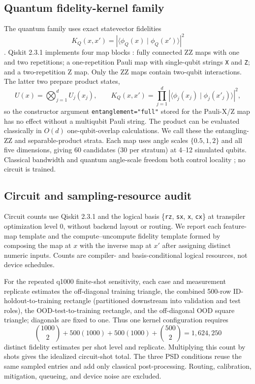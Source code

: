 \documentclass[referee,lineno,pdflatex,sn-nature]{sn-jnl}
\theoremstyle{thmstyleone}%
\theoremstyle{thmstyletwo}%
\theoremstyle{thmstylethree}%
\begin{document}
\subsection{Quantum fidelity-kernel family}

The quantum family uses exact statevector fidelities
\[
K_Q(x,x')=\left|\langle\phi_Q(x)\mid\phi_Q(x')\rangle\right|^2
\]
\cite{havlicek2019quantumenhanced,schuld2019featurehilbert}. Qiskit 2.3.1 implements four map blocks \cite{javadiabhari2024qiskit}: fully connected ZZ maps with one and two repetitions; a one-repetition Pauli map with single-qubit strings \texttt{X} and \texttt{Z}; and a two-repetition Z map. Only the ZZ maps contain two-qubit interactions. The latter two prepare product states,
\[
U(x)=\bigotimes_{j=1}^{d}U_j(x_j),\qquad
K_Q(x,x')=\prod_{j=1}^{d}
\left|\langle\phi_j(x_j)\mid\phi_j(x'_j)\rangle\right|^2,
\]
so the constructor argument \texttt{entanglement="full"} stored for the Pauli-X/Z map has no effect without a multiqubit Pauli string. The product can be evaluated classically in $O(d)$ one-qubit-overlap calculations. We call these the entangling-ZZ and separable-product strata. Each map uses angle scales $\{0.5,1,2\}$ and all five dimensions, giving 60 candidates (30 per stratum) at 4--12 simulated qubits. Classical bandwidth and quantum angle-scale freedom both control locality \cite{shaydulin2022bandwidth,canatar2023bandwidth}; no circuit is trained.

\subsection{Circuit and sampling-resource audit}

Circuit counts use Qiskit 2.3.1 and the logical basis \{\texttt{rz}, \texttt{sx}, \texttt{x}, \texttt{cx}\} at transpiler optimization level 0, without backend layout or routing. We report each feature-map template and the compute--uncompute fidelity template formed by composing the map at $x$ with the inverse map at $x'$ after assigning distinct numeric inputs. Counts are compiler- and basis-conditional logical resources, not device schedules.

For the repeated q1000 finite-shot sensitivity, each case and measurement replicate estimates the off-diagonal training triangle, the combined 500-row ID-holdout-to-training rectangle (partitioned downstream into validation and test roles), the OOD-test-to-training rectangle, and the off-diagonal OOD square triangle; diagonals are fixed to one. Thus one kernel configuration requires
\[
\binom{1000}{2}+500(1000)+500(1000)+\binom{500}{2}
=1{,}624{,}250
\]
distinct fidelity estimates per shot level and replicate. Multiplying this count by shots gives the idealized circuit-shot total. The three PSD conditions reuse the same sampled entries and add only classical post-processing. Routing, calibration, mitigation, queueing, and device noise are excluded.
\end{document}
